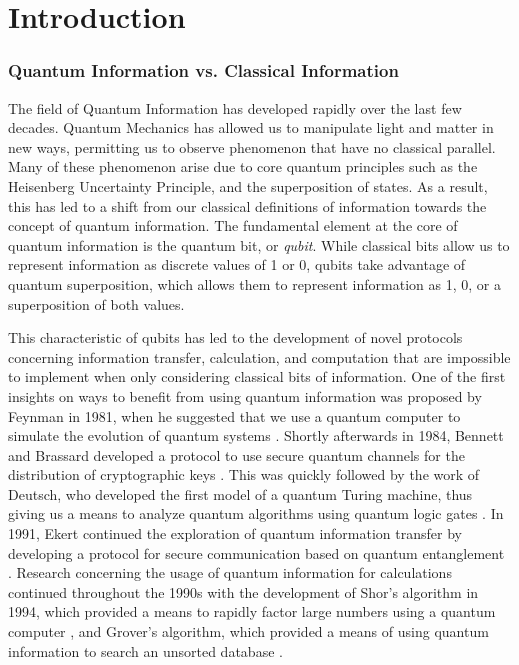 \chapter*{Introduction}
\label{introduction} 


\subsection*{Quantum Information vs. Classical Information}

The field of Quantum Information has developed rapidly over the last few
decades.  Quantum Mechanics has allowed us to manipulate light and matter in new ways, permitting us to observe phenomenon that have no classical parallel.  Many of
these phenomenon arise due to core quantum principles such as the Heisenberg
Uncertainty Principle, and the superposition of states.  As a result, this has led to a shift from our classical definitions of information towards the concept of quantum information.  The fundamental element at the core of
quantum information is the quantum bit, or \emph{qubit}.  While classical bits
allow us to represent information as discrete values of 1 or 0, qubits take
advantage of quantum superposition, which allows them to represent information as 1, 0, or a superposition of both values.

This characteristic of qubits has led to the development of novel protocols
concerning information transfer, calculation, and computation that are
impossible to implement when only considering classical bits of information.  One of the first insights on ways to benefit from using quantum information was proposed by Feynman in 1981, when he suggested that we use a quantum computer to
simulate the evolution of quantum systems \cite{feynman1982simulating}.
Shortly afterwards in 1984, Bennett and Brassard developed a protocol to use
secure quantum channels for the distribution of cryptographic keys
\cite{Bennett84}.  This was quickly followed by the work of Deutsch, who
developed the first model of a quantum Turing machine, thus giving us a means to
analyze quantum algorithms using quantum logic gates \cite{Deutsch85}.
In 1991, Ekert continued the exploration of quantum information transfer by
developing a protocol for secure communication based on quantum entanglement
\cite{Ekert91}.  Research concerning the usage of quantum information for
calculations continued throughout the 1990s with the development of Shor's
algorithm in 1994, which provided a means to rapidly factor large numbers
using a quantum computer \cite{Shor94}, and Grover's algorithm, which provided a
means of using quantum information to search an unsorted database
\cite{Grover96}. 

